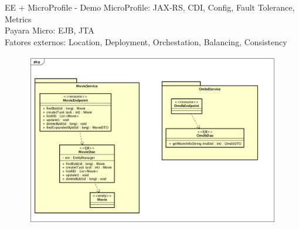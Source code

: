 \documentclass{beamer}
\begin{document}
\begin{frame}{EE + MicroProfile - Demo}
\footnotesize MicroProfile: JAX-RS, CDI, Config, Fault Tolerance, Metrics\\
Payara Micro: EJB, JTA\\
Fatores externos: Location, Deployment, Orchestation, Balancing, Consistency
\begin{figure}
\centering
\includegraphics[width=0.95\linewidth]{Images/demomicro}
\end{figure}
\end{frame}
\end{document}
